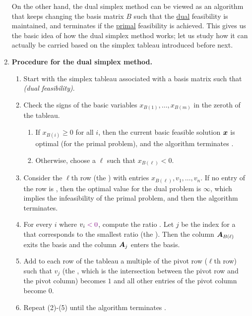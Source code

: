 \begin{enumerate}
On the other hand, the dual simplex method can be viewed as an algorithm that
keeps changing the basis matrix \(B\) such that the \underline{dual}
feasibility is maintained, and terminates if the \underline{primal} feasibility
is achieved. This gives us the basic idea of how the dual simplex method works;
let us study how it can actually be carried based on the simplex tableau
introduced before next.

\item \textbf{Procedure for the dual simplex method.}
\begin{enumerate}[label={(\arabic*)}]
\item Start with the simplex tableau associated with a basis matrix such that
 \emph{(dual feasibility)}.
\item Check the signs of the basic variables \(x_{B(1)},\dotsc,x_{B(m)}\) in
the zeroth  of the tableau.
\begin{enumerate}
\item If \(x_{B(i)}\ge 0\) for all \(i\), then the current basic feasible
solution \(\bm{x}\) is optimal (for the primal problem), and the algorithm
terminates .
\item Otherwise, choose a \(\ell\) such that \(x_{B(\ell)}<0\).
\end{enumerate}
\item Consider the \(\ell\)th row (the ) with entries
\(x_{B(\ell)},v_1,\dotsc,v_n\). If no entry of the row is , then
the optimal value for the dual problem is \(\infty\), which implies the
infeasibility of the primal problem, and then the algorithm terminates.
\item For every \(i\) where \(v_i\vc{<0}\), compute the ratio
. Let \(j\) be the index for a  that
corresponds to the smallest ratio (the ). Then the column
\(\bm{A}_{B(\ell)}\) exits the basis and the column \(\bm{A}_j\) enters the
basis.
\item Add to each row of the tableau a multiple of the pivot row (\(\ell\)th
row) such that \(v_j\) (the , which is the intersection
between the pivot row and the pivot column) becomes \(1\) and all other entries
of the pivot column become \(0\).
\item Repeat (2)-(5) until the algorithm terminates .
\end{enumerate}
\begin{remark}

\end{remark}
\end{enumerate}
